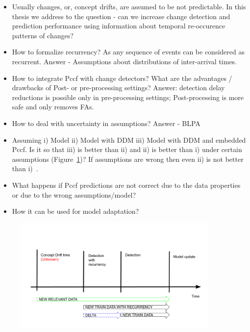 \begin{itemize}

  \item Usually changes, or, concept drifts, are assumed to be not predictable. In this thesis we address to the question - can we increase change detection and prediction performance using information about temporal re-occurence patterns of changes? 

  \item How to formalize recurrency? As any sequence of events can be considered as recurrent. Answer - Assumptions about distributions of inter-arrival times.

  \item How to integrate Pccf with change detectors? What are the advantages / drawbacks of  Post- or pre-processing settings? Answer: detection delay reductions is possible only in pre-processing settings; Post-processing is more safe and only removes FAs.

  \item How to deal with uncertainty in assumptions? Answer - BLPA

  \item Assuming i) Model ii) Model with DDM iii) Model with DDM and embedded Pccf. Is it so that iii) is better than ii) and ii) is better than i) under certain assumptions (Figure~\ref{fig:research_question})? If assumptions are wrong then even ii) is not better than i)~\cite{SouzaRMB20}.

  \item What happens if Pccf predictions are not correct due to the data properties or due to the wrong assumptions/model? 

  \item How it can be used for model adaptation?

\end{itemize}

\begin{figure}[htb!]
	\centering
	\includegraphics[width=0.9\textwidth]{images/google_slides/scheme_cd_recurrency}
  \caption{
	}\label{fig:research_question}
\end{figure}


